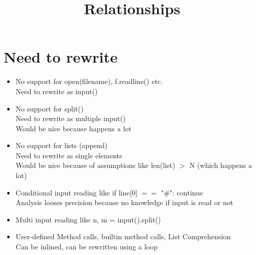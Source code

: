 \documentclass[11pt]{article}
\begin{document}
\title{Relationships}

\maketitle


\section{Need to rewrite}

\begin{itemize}
\item No support for open(filename), f.readline() etc.\\
Need to rewrite as input()
\item No support for split()\\
Need to rewrite as multiple input()\\
Would be nice because happens a lot
\item No support for lists (append)\\
Need to rewrite as single elements\\
Would be nice because of assumptions like len(list) $>$ N (which happens a lot)
\item Conditional input reading like if line[0] $==$ "\#": continue\\
Analysis looses precision because no knowledge if input is read or not
\item Multi input reading like n, m = input().split()
\item User-defined Method calls, builtin method calls, List Comprehension\\
Can be inlined, can be rewritten using a loop
\end{itemize}
\end{document}
